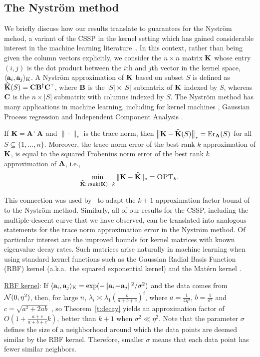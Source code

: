 \documentclass{article}
\begin{document}
  \subsection{The Nystr\"om method}\label{s:nystrom}
  We briefly discuss how our results translate to guarantees for the Nystr\"om
  mehod, a variant of the CSSP in the kernel setting which has
  gained considerable interest in the machine learning literature~\citep{dm_kernel_JRNL,revisiting-nystrom}.
In this context, rather than being given the column vectors
explicitly, we consider the 
$n\times n$ matrix $\mathbf K$ whose entry $(i,j)$ is the dot product
between the $i$th and $j$th vector in the kernel space,
$\langle\mathbf a_i,\mathbf a_j\rangle_\text{K}$. A Nystr\"om approximation of $\mathbf K$ based on subset $S$
is defined as $\Kbh(S) = \C\B^{\dagger}\C^\top$, where $\mathbf B$ is the
$|S|\times |S|$ submatrix of $\mathbf K$ indexed by $S$, whereas $\mathbf C$ is the
$n\times |S|$  submatrix with columns indexed by $S$. The Nystr\"om
method has many applications in machine learning, including for
kernel machines \citep{Williams01Nystrom}, Gaussian Process regression 
\citep{sparse-variational-gp} and Independent Component Analysis
\citep{Bach2003}. 
\begin{remark}
  If $\K=\A^\top\A$ and $\|\cdot\|_*$ is the trace norm, then
    $\big\|\mathbf K-{\widehat{\mathbf K}}(S)\big\|_* = \mathrm{Er}_{\mathbf A}(S)$ for all $S\subseteq\{1,...,n\}$.
Moreover, the trace norm error of the best rank $k$ approximation of
$\mathbf K$, 
is equal to the squared Frobenius norm error of the 
best rank $k$ approximation of $\mathbf A$, i.e.,
\[\min_{{\widehat{\mathbf K}}:\,\mathrm{rank}(\mathbf K)=k}\|\mathbf K-{\widehat{\mathbf K}}\|_* = {\textsc{OPT}_k}.\]
\end{remark}
This connection was used by~\citet{belabbas-wolfe09} to adapt the
$k+1$ approximation factor bound 
of~\citet{pca-volume-sampling} to the Nystr\"om method.   
Similarly, all of our results for the CSSP, including the
multiple-descent curve that we have observed, can be translated into analogous
statements for the trace norm approximation error in the Nystr\"om
method. Of particular interest 
are the improved bounds for kernel matrices with known eigenvalue
decay rates. Such matrices arise naturally in machine learning when
using standard kernel functions such as the Gaussian Radial Basis Function
(RBF) kernel (a.k.a.~the squared exponential kernel) and the
Mat\'ern kernel \citep{sparse-variational-gp}.

\underline{RBF kernel}: If
$\langle\mathbf a_i,\mathbf a_j\rangle_\text{K}=\exp(-\|\mathbf a_i\!-\!\mathbf a_j\|^2/\sigma^2)$ 
and the data comes from $\mathcal{N}(0,\eta^2)$, then,
  for large $n$,
  $\lambda_i\!\asymp\!\lambda_1(\frac{b}{a+b+c})^i$, where
  $a=\frac1{4\eta^2}$, $b=\frac1{\sigma^2}$ and $c=\sqrt{a^2\!+\!2ab}$
  \citep{Santa97gaussianregression},
  so Theorem~\ref{t:decay} yields an approximation factor of
  $O(1\!+\!\frac{a+c}{a+b+c}k)$, better than $k\!+\!1$ when
  $\sigma^2\ll\eta^2$. Note that the parameter $\sigma$ defines the
  size of a neighborhood around which the data points are deemed
  similar by the RBF kernel. Therefore, smaller $\sigma$ means that
  each data point has fewer similar neighbors.
\end{document}
